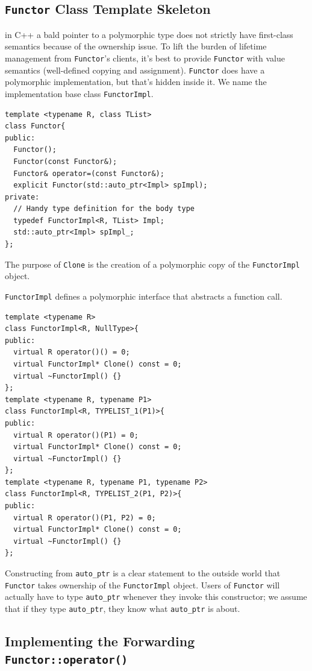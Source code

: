 \subsection{\texttt{Functor} Class Template Skeleton}

in C++ a bald pointer to a polymorphic type does not strictly have first-class
semantics because of the ownership issue. To lift the burden of
lifetime management from \texttt{Functor}'s clients, it's best to provide
\texttt{Functor} with value semantics (well-defined copying and assignment).
\texttt{Functor} does have a polymorphic implementation, but that's hidden
inside it. We name the implementation base class \texttt{FunctorImpl}.

\begin{verbatim}
template <typename R, class TList>
class Functor{
public:
  Functor();
  Functor(const Functor&);
  Functor& operator=(const Functor&);
  explicit Functor(std::auto_ptr<Impl> spImpl);
private:
  // Handy type definition for the body type
  typedef FunctorImpl<R, TList> Impl;
  std::auto_ptr<Impl> spImpl_;
};
\end{verbatim}
The purpose of \texttt{Clone} is the creation of a polymorphic copy of
the \texttt{FunctorImpl} object.

\texttt{FunctorImpl} defines a polymorphic interface that abstracts a
function call.

\begin{verbatim}
template <typename R>
class FunctorImpl<R, NullType>{
public:
  virtual R operator()() = 0;
  virtual FunctorImpl* Clone() const = 0;
  virtual ~FunctorImpl() {}
};
template <typename R, typename P1>
class FunctorImpl<R, TYPELIST_1(P1)>{
public:
  virtual R operator()(P1) = 0;
  virtual FunctorImpl* Clone() const = 0;
  virtual ~FunctorImpl() {}
};
template <typename R, typename P1, typename P2>
class FunctorImpl<R, TYPELIST_2(P1, P2)>{
public:
  virtual R operator()(P1, P2) = 0;
  virtual FunctorImpl* Clone() const = 0;
  virtual ~FunctorImpl() {}
};
\end{verbatim}

Constructing from \texttt{auto\_ptr} is a clear statement to the
outside world that \texttt{Functor} takes ownership of 
the \texttt{FunctorImpl} object. Users of \texttt{Functor} will
actually have to type \texttt{auto\_ptr} whenever they invoke 
this constructor; we assume that if they type \texttt{auto\_ptr}, they
know what \texttt{auto\_ptr} is about.

\subsection{Implementing the Forwarding \texttt{Functor::operator()}}

